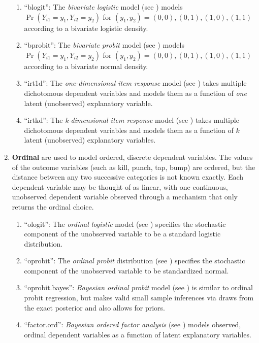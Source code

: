 \documentclass[letterpaper,10pt,english]{sphinxmanual}
\begin{document}
\begin{enumerate}
\begin{enumerate}
\item {} 
“blogit”: The \emph{bivariate logistic} model (see ) models
\(\Pr(Y_{i1} = y_1, Y_{i2} = y_2)\) for
\((y_1, y_2) = {(0,0), (0,1), (1,0), (1,1)}\) according to a
bivariate logistic density.

\item {} 
“bprobit”: The \emph{bivariate probit} model (see ) models
\(\Pr(Y_{i1} = y_1, Y_{i2} = y_2)\) for
\((y_1, y_2) = {(0,0), (0,1), (1,0), (1,1)}\) according to a
bivariate normal density.

\item {} 
“irt1d”: The \emph{one-dimensional item response} model (see ) takes
multiple dichotomous dependent variables and models them as a
function of \emph{one} latent (unobserved) explanatory variable.

\item {} 
“irtkd”: The \emph{k-dimensional item response} model (see ) takes
multiple dichotomous dependent variables and models them as a
function of \(k\) latent (unobserved) explanatory variables.

\end{enumerate}

\item {} 
\textbf{Ordinal} are used to model ordered, discrete dependent variables.
The values of the outcome variables (such as kill, punch, tap, bump)
are ordered, but the distance between any two successive categories
is not known exactly. Each dependent variable may be thought of as
linear, with one continuous, unobserved dependent variable observed
through a mechanism that only returns the ordinal choice.
\begin{enumerate}
\item {} 
“ologit”: The \emph{ordinal logistic} model (see ) specifies the
stochastic component of the unobserved variable to be a standard
logistic distribution.

\item {} 
“oprobit”: The \emph{ordinal probit} distribution (see ) specifies the
stochastic component of the unobserved variable to be standardized
normal.

\item {} 
“oprobit.bayes”: \emph{Bayesian ordinal probit} model (see ) is similar
to ordinal probit regression, but makes valid small sample
inferences via draws from the exact posterior and also allows for
priors.

\item {} 
“factor.ord”: \emph{Bayesian ordered factor analysis} (see ) models
observed, ordinal dependent variables as a function of latent
explanatory variables.


\end{enumerate}
\end{enumerate}
\end{document}
